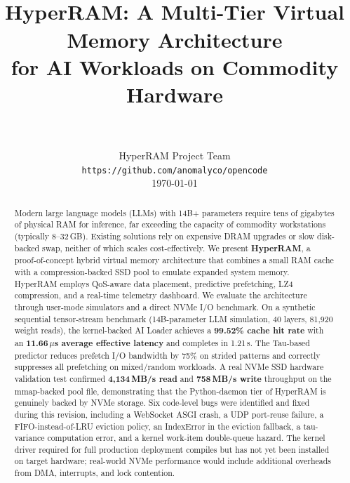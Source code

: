 \documentclass[11pt,a4paper]{article}
\title{
    \vspace{2cm}
    \HRule \\[0.8cm]
    {\LARGE \bfseries HyperRAM: A Multi-Tier Virtual Memory Architecture \\[0.3cm]
     for AI Workloads on Commodity Hardware} \\[0.4cm]
    \HRule \\[1.2cm]
}
\author{
    \large HyperRAM Project Team \\[0.3cm]
    \normalsize\texttt{https://github.com/anomalyco/opencode} \\[0.3cm]
    \today
}
\date{}
\newcommand{\micro}{$\mu$}
\begin{document}
\maketitle
\thispagestyle{empty}
\newpage

\begin{abstract}
Modern large language models (LLMs) with 14B+ parameters require tens of gigabytes of physical RAM for inference, far exceeding the capacity of commodity workstations (typically 8--32\,GB). Existing solutions rely on expensive DRAM upgrades or slow disk-backed swap, neither of which scales cost-effectively. We present \textbf{HyperRAM}, a proof-of-concept hybrid virtual memory architecture that combines a small RAM cache with a compression-backed SSD pool to emulate expanded system memory. HyperRAM employs QoS-aware data placement, predictive prefetching, LZ4 compression, and a real-time telemetry dashboard. We evaluate the architecture through user-mode simulators and a direct NVMe I/O benchmark. On a synthetic sequential tensor-stream benchmark (14B-parameter LLM simulation, 40 layers, 81{,}920 weight reads), the kernel-backed AI Loader achieves a \textbf{99.52\% cache hit rate} with an \textbf{11.66\,\micro{}s average effective latency} and completes in 1.21\,s. The Tau-based predictor reduces prefetch I/O bandwidth by 75\% on strided patterns and correctly suppresses all prefetching on mixed/random workloads. A real NVMe SSD hardware validation test confirmed \textbf{4{,}134\,MB/s read} and \textbf{758\,MB/s write} throughput on the mmap-backed pool file, demonstrating that the Python-daemon tier of HyperRAM is genuinely backed by NVMe storage. Six code-level bugs were identified and fixed during this revision, including a WebSocket ASGI crash, a UDP port-reuse failure, a FIFO-instead-of-LRU eviction policy, an IndexError in the eviction fallback, a tau-variance computation error, and a kernel work-item double-queue hazard. The kernel driver required for full production deployment compiles but has not yet been installed on target hardware; real-world NVMe performance would include additional overheads from DMA, interrupts, and lock contention.
\end{abstract}

\vspace{1cm}

\tableofcontents
\newpage

\end{document}
